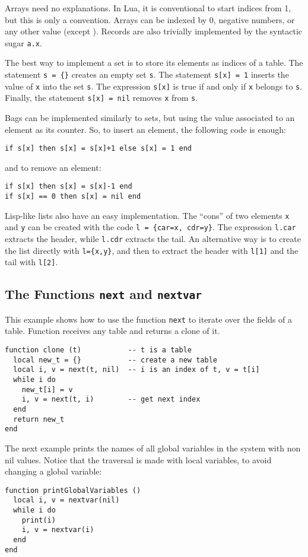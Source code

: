 Arrays need no explanations.
In Lua, it is conventional to start indices from 1,
but this is only a convention.
Arrays can be indexed by 0, negative numbers, or any other value (except \nil).
Records are also trivially implemented by the syntactic sugar
\verb'a.x'.

The best way to implement a set is to store
its elements as indices of a table.
The statement \verb's = {}' creates an empty set \verb's'. 
The statement \verb's[x] = 1' inserts the value of \verb'x' into
the set \verb's'.
The expression \verb's[x]' is true if and only if
\verb'x' belongs to \verb's'.
Finally, the statement \verb's[x] = nil' removes \verb'x' from \verb's'.

Bags can be implemented similarly to sets,
but using the value associated to an element as its counter.
So, to insert an element, 
the following code is enough:
\begin{verbatim}
if s[x] then s[x] = s[x]+1 else s[x] = 1 end
\end{verbatim}
and to remove an element:
\begin{verbatim}
if s[x] then s[x] = s[x]-1 end
if s[x] == 0 then s[x] = nil end
\end{verbatim}

Lisp-like lists also have an easy implementation.
The ``cons'' of two elements \verb'x' and \verb'y' can be
created with the code \verb'l = {car=x, cdr=y}'.
The expression \verb'l.car' extracts the header, 
while \verb'l.cdr' extracts the tail.
An alternative way is to create the list directly with \verb'l={x,y}',
and then to extract the header with \verb'l[1]' and
the tail with \verb'l[2]'.

\subsection{The Functions {\tt next} and {\tt nextvar}} \label{exnext}
This example shows how to use the function \verb'next' to iterate
over the fields of a table.
Function  receives any table and returns a clone of it.
\begin{verbatim}
function clone (t)           -- t is a table
  local new_t = {}           -- create a new table
  local i, v = next(t, nil)  -- i is an index of t, v = t[i]
  while i do
    new_t[i] = v
    i, v = next(t, i)        -- get next index
  end
  return new_t
end
\end{verbatim}

The next example prints the names of all global variables
in the system with non nil values.
Notice that the traversal is made with local variables,
to avoid changing a global variable:
\begin{verbatim}
function printGlobalVariables ()
  local i, v = nextvar(nil)
  while i do
    print(i)
    i, v = nextvar(i)
  end
end
\end{verbatim}



